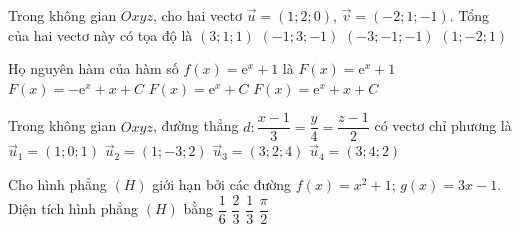 \begin{ex}%
	Trong không gian $Oxyz$, cho hai vectơ $\overrightarrow{u}=(1;2;0)$, $\overrightarrow{v}=(-2;1;-1)$. Tổng của hai vectơ này có tọa độ là
	\choice
	{$(3;1;1)$}
	{\True $(-1;3;-1)$}
	{$(-3;-1;-1)$}
	{$(1;-2;1)$}
\end{ex}

\begin{ex}%
	Họ nguyên hàm của hàm số $f(x)=\mathrm{e}^{x}+1$ là
	\choice
	{$F(x)=\mathrm{e}^{x}+1$}
	{$F(x)=-\mathrm{e}^{x}+x+C$}
	{$F(x)=\mathrm{e}^{x}+C$}
	{\True $F(x)=\mathrm{e}^{x}+x+C$}
\end{ex}

\begin{ex}%
	Trong không gian $Oxyz$, đường thẳng $d\colon \dfrac{x-1}{3}=\dfrac{y}{4}=\dfrac{z-1}{2}$ có vectơ chỉ phương là
	\choice
	{$\overrightarrow{u}_1=(1;0;1)$}
	{$\overrightarrow{u}_2=(1;-3;2)$}
	{$\overrightarrow{u}_3=(3;2;4)$}
	{\True $\overrightarrow{u}_4=(3;4;2)$}
\end{ex}

\begin{ex}%
	Cho hình phẳng $(H)$ giới hạn bởi các đường $f(x)=x^{2}+1$; $g(x)=3x-1$. Diện tích hình phẳng $(H)$ bằng
	\choice
	{\True $\dfrac{1}{6}$}
	{$\dfrac{2}{3}$}
	{$\dfrac{1}{3}$}
	{$\dfrac{\pi}{2}$}
\end{ex}

